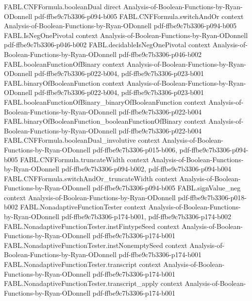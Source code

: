 \begin{theorem}
\proofstep
  {FABL.CNFFormula.booleanDual}
  {direct}
  {Analysis-of-Boolean-Functions-by-Ryan-ODonnell}
  {pdf-ffbe9c7b3306-p094-b005}
\proofstep
  {FABL.CNFFormula.switchAndOr}
  {context}
  {Analysis-of-Boolean-Functions-by-Ryan-ODonnell}
  {pdf-ffbe9c7b3306-p094-b005}
\proofstep
  {FABL.IsNegOnePivotal}
  {context}
  {Analysis-of-Boolean-Functions-by-Ryan-ODonnell}
  {pdf-ffbe9c7b3306-p046-b002}
\proofstep
  {FABL.decidableIsNegOnePivotal}
  {context}
  {Analysis-of-Boolean-Functions-by-Ryan-ODonnell}
  {pdf-ffbe9c7b3306-p046-b002}
\proofstep
  {FABL.booleanFunctionOfBinary}
  {context}
  {Analysis-of-Boolean-Functions-by-Ryan-ODonnell}
  {pdf-ffbe9c7b3306-p022-b004,
    pdf-ffbe9c7b3306-p023-b001}
\proofstep
  {FABL.binaryOfBooleanFunction}
  {context}
  {Analysis-of-Boolean-Functions-by-Ryan-ODonnell}
  {pdf-ffbe9c7b3306-p022-b004,
    pdf-ffbe9c7b3306-p023-b001}
\proofstep
  {FABL.booleanFunctionOfBinary_binaryOfBooleanFunction}
  {context}
  {Analysis-of-Boolean-Functions-by-Ryan-ODonnell}
  {pdf-ffbe9c7b3306-p022-b004}
\proofstep
  {FABL.binaryOfBooleanFunction_booleanFunctionOfBinary}
  {context}
  {Analysis-of-Boolean-Functions-by-Ryan-ODonnell}
  {pdf-ffbe9c7b3306-p022-b004}
\proofstep
  {FABL.CNFFormula.booleanDual_involutive}
  {context}
  {Analysis-of-Boolean-Functions-by-Ryan-ODonnell}
  {pdf-ffbe9c7b3306-p015-b006,
    pdf-ffbe9c7b3306-p094-b005}
\proofstep
  {FABL.CNFFormula.truncateWidth}
  {context}
  {Analysis-of-Boolean-Functions-by-Ryan-ODonnell}
  {pdf-ffbe9c7b3306-p094-b002,
    pdf-ffbe9c7b3306-p094-b004}
\proofstep
  {FABL.CNFFormula.switchAndOr_truncateWidth}
  {context}
  {Analysis-of-Boolean-Functions-by-Ryan-ODonnell}
  {pdf-ffbe9c7b3306-p094-b005}
\proofstep
  {FABL.signValue_neg}
  {context}
  {Analysis-of-Boolean-Functions-by-Ryan-ODonnell}
  {pdf-ffbe9c7b3306-p018-b002}
\proofstep
  {FABL.NonadaptiveFunctionTester}
  {context}
  {Analysis-of-Boolean-Functions-by-Ryan-ODonnell}
  {pdf-ffbe9c7b3306-p174-b001,
    pdf-ffbe9c7b3306-p174-b002}
\proofstep
  {FABL.NonadaptiveFunctionTester.instFintypeSeed}
  {context}
  {Analysis-of-Boolean-Functions-by-Ryan-ODonnell}
  {pdf-ffbe9c7b3306-p174-b001}
\proofstep
  {FABL.NonadaptiveFunctionTester.instNonemptySeed}
  {context}
  {Analysis-of-Boolean-Functions-by-Ryan-ODonnell}
  {pdf-ffbe9c7b3306-p174-b001}
\proofstep
  {FABL.NonadaptiveFunctionTester.transcript}
  {context}
  {Analysis-of-Boolean-Functions-by-Ryan-ODonnell}
  {pdf-ffbe9c7b3306-p174-b001}
\proofstep
  {FABL.NonadaptiveFunctionTester.transcript_apply}
  {context}
  {Analysis-of-Boolean-Functions-by-Ryan-ODonnell}
  {pdf-ffbe9c7b3306-p174-b001}

\end{theorem}

